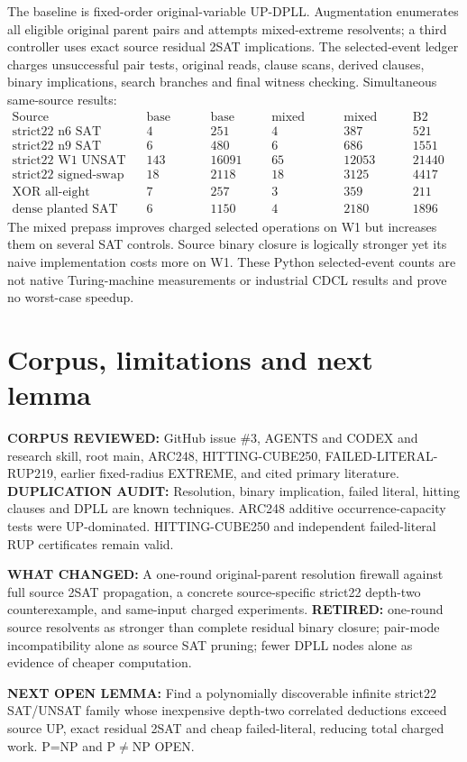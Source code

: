 \documentclass[10pt]{article}
\begin{document}
The baseline is fixed-order original-variable UP-DPLL. Augmentation enumerates all eligible original parent pairs and attempts mixed-extreme resolvents; a third controller uses exact source residual 2SAT implications. The selected-event ledger charges unsuccessful pair tests, original reads, clause scans, derived clauses, binary implications, search branches and final witness checking. Simultaneous same-source results:
\[
\begin{array}{lrrrrr}
\text{Source}&\text{base nodes}&\text{base work}&\text{mixed nodes}&\text{mixed work}&\text{B2 work}\\
\hline
\text{strict22 n6 SAT}&4&251&4&387&521\\
\text{strict22 n9 SAT}&6&480&6&686&1551\\
\text{strict22 W1 UNSAT}&143&16091&65&12053&21440\\
\text{strict22 signed-swap SAT}&18&2118&18&3125&4417\\
\text{XOR all-eight UNSAT}&7&257&3&359&211\\
\text{dense planted SAT}&6&1150&4&2180&1896
\end{array}
\]
The mixed prepass improves charged selected operations on W1 but increases them on several SAT controls. Source binary closure is logically stronger yet its naive implementation costs more on W1. These Python selected-event counts are not native Turing-machine measurements or industrial CDCL results and prove no worst-case speedup.

\section{Corpus, limitations and next lemma}
\noindent\textbf{CORPUS REVIEWED:} GitHub issue \#3, AGENTS and CODEX and research skill, root main, ARC248, HITTING-CUBE250, FAILED-LITERAL-RUP219, earlier fixed-radius EXTREME, and cited primary literature. \textbf{DUPLICATION AUDIT:} Resolution, binary implication, failed literal, hitting clauses and DPLL are known techniques. ARC248 additive occurrence-capacity tests were UP-dominated. HITTING-CUBE250 and independent failed-literal RUP certificates remain valid.
\par\noindent\textbf{WHAT CHANGED:} A one-round original-parent resolution firewall against full source 2SAT propagation, a concrete source-specific strict22 depth-two counterexample, and same-input charged experiments. \textbf{RETIRED:} one-round source resolvents as stronger than complete residual binary closure; pair-mode incompatibility alone as source SAT pruning; fewer DPLL nodes alone as evidence of cheaper computation.
\par\noindent\textbf{NEXT OPEN LEMMA:} Find a polynomially discoverable infinite strict22 SAT/UNSAT family whose inexpensive depth-two correlated deductions exceed source UP, exact residual 2SAT and cheap failed-literal, reducing total charged work. P=NP and P$\ne$NP OPEN.
\end{document}
